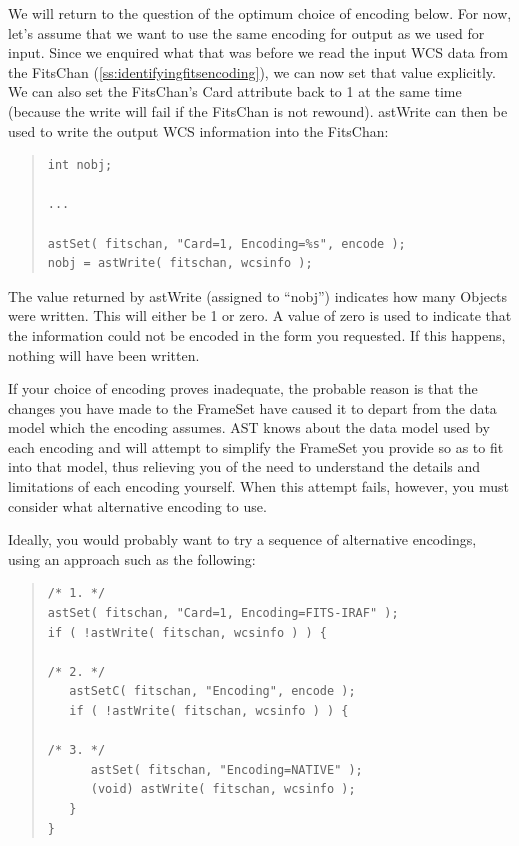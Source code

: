 \documentclass[twoside,11pt]{article}
\newcommand{\htmlref}[2]{#1}
\newcommand{\secref}[1]{\S\ref{#1}}
\renewcommand{\secref}[1]{\ref{#1}}
\begin{document}
We will return to the question of the optimum choice of encoding
below.  For now, let's assume that we want to use the same encoding
for output as we used for input. Since we enquired what that was
before we read the input WCS data from the FitsChan
(\secref{ss:identifyingfitsencoding}), we can now set that value
explicitly. We can also set the FitsChan's \htmlref{Card}{Card} attribute back to 1 at
the same time (because the write will fail if the FitsChan is not
rewound). \htmlref{astWrite}{astWrite} can then be used to write the output WCS
information into the FitsChan:

\begin{quote}
\small
\begin{verbatim}
int nobj;

...

astSet( fitschan, "Card=1, Encoding=%s", encode );
nobj = astWrite( fitschan, wcsinfo );
\end{verbatim}
\normalsize
\end{quote}

The value returned by astWrite (assigned to ``nobj'') indicates how
many Objects were written. This will either be 1 or zero. A value of
zero is used to indicate that the information could not be encoded in
the form you requested. If this happens, nothing will have been
written.

If your choice of encoding proves inadequate, the probable reason is
that the changes you have made to the FrameSet have caused it to
depart from the data model which the encoding assumes.  AST knows
about the data model used by each encoding and will attempt to
simplify the FrameSet you provide so as to fit into that model, thus
relieving you of the need to understand the details and limitations of
each encoding yourself. When this attempt fails, however, you must
consider what alternative encoding to use.

Ideally, you would probably want to try a sequence of alternative
encodings, using an approach such as the following:

\begin{quote}
\small
\begin{verbatim}
/* 1. */
astSet( fitschan, "Card=1, Encoding=FITS-IRAF" );
if ( !astWrite( fitschan, wcsinfo ) ) {

/* 2. */
   astSetC( fitschan, "Encoding", encode );
   if ( !astWrite( fitschan, wcsinfo ) ) {

/* 3. */
      astSet( fitschan, "Encoding=NATIVE" );
      (void) astWrite( fitschan, wcsinfo );
   }
}
\end{verbatim}
\normalsize
\end{quote}
\end{document}
